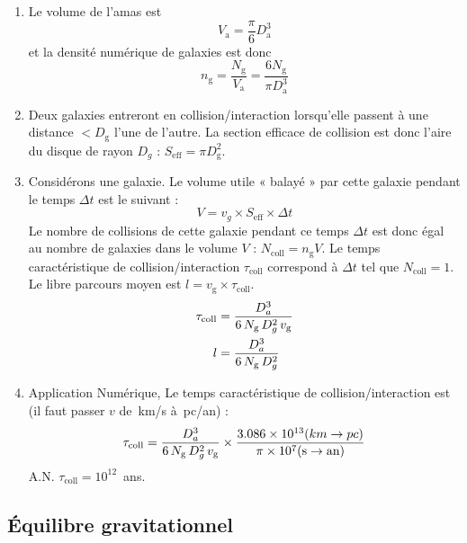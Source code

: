 \documentclass[a4paper,10pt]{report}
\begin{document}
\begin{Answer}
  \begin{enumerate}
  \item Le volume de l'amas est
    $$
    V_{\mathrm{a}}=\frac{\pi}{6}D_{\mathrm{a}}^3
    $$
    et la densité numérique de galaxies est donc
    $$
    n_{\mathrm{g}}=\frac{N_{\mathrm{g}}}{V_{\mathrm{a}}}=
    \frac{6N_{\mathrm{g}}}{\pi D_{\mathrm{a}}^3}
    $$

  \item Deux galaxies entreront en collision/interaction lorsqu'elle
    passent à une distance $< D_{\mathrm{g}}$ l'une de l'autre. La
    section efficace de collision est donc l'aire du disque de rayon
    $D_{g}$ : $S_{\mathrm{eff}} = \pi D^2_{\mathrm{g}}$.

  \item Considérons une galaxie. Le volume utile « balayé » par cette
    galaxie pendant le temps $\Delta t$ est le suivant :
    $$
    V = v_{g} \times S_{\mathrm{eff}} \times \Delta t
    $$
    Le nombre de collisions de cette galaxie pendant ce temps $\Delta
    t$ est donc égal au nombre de galaxies dans le volume $V$ :
    $N_{\mathrm{coll}} = n_{\mathrm{g}}V$. Le temps caractéristique de
    collision/interaction $\tau_{\mathrm{coll}}$ correspond à $\Delta
    t$ tel que $N_{\mathrm{coll}} = 1$. Le libre parcours moyen est $l
    = v_{\mathrm{g}} \times \tau_{\mathrm{coll}}$.
    \begin{align*}
      \tau_{\mathrm{coll}} &= {D_{a}^3 \over 6\,N_{\mathrm{g}}\,D_{g}^2\,v_{\mathrm{g}}} \\
      l &= {D_{a}^3 \over 6\,N_{\mathrm{g}}\,D_{g}^2}
    \end{align*}

  \item Application Numérique, Le temps caractéristique de
    collision/interaction est (il faut passer $v$ de~km/s à~pc/an) :
    $$
    \tau_{\mathrm{coll}} = {D_{a}^3 \over
      6\,N_{\mathrm{g}}\,D_{g}^2\,v_{\mathrm{g}}} \times {3.086\times
      10^{13} \mathrm(km \to pc) \over \pi \times 10^7 \mathrm{(s \to
        an)}}
    $$
    A.N. $\tau_{\mathrm{coll}} = 10^{12}$~ans.
  \end{enumerate}

\end{Answer}



\subsection{Équilibre gravitationnel}
\end{document}
